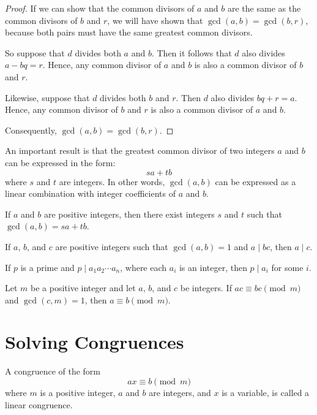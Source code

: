 \documentclass[../discrete.tex]{subfiles}
\begin{document}
\begin{proof}
    If we can show that the common divisors of $a$ and $b$ are the same as the common divisors of 
    $b$ and $r$, we will have shown that $\gcd(a,b)=\gcd(b,r)$, because both pairs must have the same 
    greatest common divisors.

    So suppose that $d$ divides both $a$ and $b$. Then it follows that $d$ also divides $a-bq=r$.
    Hence, any common divisor of $a$ and $b$ is also a common divisor of $b$ and $r$.

    Likewise, suppose that $d$ divides both $b$ and $r$. Then $d$ also divides $bq+r=a$.
    Hence, any common divisor of $b$ and $r$ is also a common divisor of $a$ and $b$.

    Consequently, $\gcd(a,b)=\gcd(b,r)$.
\end{proof}

An important result is that the greatest common divisor of two integers $a$ and $b$ can be expressed in the form:
\[sa+tb\]
where $s$ and $t$ are integers. In other words, $\gcd(a,b)$ can be expressed as a linear combination with integer coefficients of $a$ and $b$.

\begin{theorem}
    If $a$ and $b$ are positive integers, then there exist integers $s$ and $t$ such that $\gcd(a,b)=sa+tb$.
\end{theorem}

\begin{lemma}
    If $a$, $b$, and $c$ are positive integers such that $\gcd(a,b)=1$ and $a\mid bc$, then $a\mid c$.
\end{lemma}

\begin{lemma}
    If $p$ is a prime and $p\mid a_1a_2\cdots a_n$, where each $a_i$ is an integer, then $p\mid a_i$ for some $i$.
\end{lemma}

\begin{theorem}
    Let $m$ be a positive integer and let $a$, $b$, and $c$ be integers. If $ac\equiv bc \pmod{m}$ and $\gcd(c,m)=1$, then $a\equiv b\pmod{m}$.
\end{theorem}


\section{Solving Congruences}
A congruence of the form 
\[ax\equiv b\pmod{m}\]
where $m$ is a positive integer, $a$ and $b$ are integers, and $x$ is a variable, is called a linear congruence.
\end{document}
